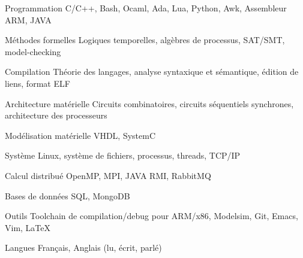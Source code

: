 


\begin{cvskills}


\cvskill
{Programmation} %
{C/C++, Bash, Ocaml, Ada, Lua, Python, Awk, Assembleur ARM, JAVA} %


\cvskill
{Méthodes formelles} %
{Logiques temporelles, algèbres de processus, SAT/SMT, model-checking} %


\cvskill
{Compilation}%
{Théorie des langages, analyse syntaxique et sémantique, édition de liens, format ELF}

\cvskill
{Architecture matérielle}%
{Circuits combinatoires, circuits séquentiels synchrones, architecture des processeurs}

\cvskill
{Modélisation matérielle}%
{VHDL, SystemC}


\cvskill
{Système}%
{Linux, système de fichiers, processus, threads, TCP/IP}


\cvskill
{Calcul distribué}%
{OpenMP, MPI, JAVA RMI, RabbitMQ}


\cvskill
{Bases de données}%
{SQL, MongoDB}


\cvskill
{Outils}%
{Toolchain de compilation/debug pour ARM/x86, Modelsim, Git, Emacs, Vim, \LaTeX}


\cvskill
{Langues} %
{Français, Anglais (lu, écrit, parlé)} %


\end{cvskills}